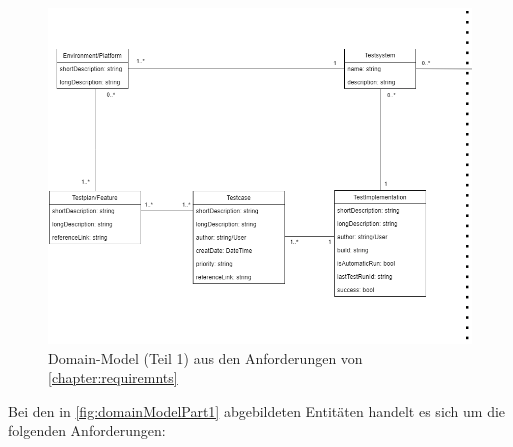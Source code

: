 \documentclass[a4paper, fontsize=11pt, parskip=half, twoside]{scrreprt}
\begin{document}
	\begin{figure}[ht]
		\centering
		\includegraphics[scale=0.6]{assets/TCMS_DomainModel_part1.png}
		\caption{Domain-Model (Teil 1) aus den Anforderungen von \autoref{chapter:requiremnts}}
		\label{fig:domainModelPart1}
	\end{figure}

	Bei den in \autoref{fig:domainModelPart1} abgebildeten Entitäten handelt es sich um die folgenden Anforderungen:
	
\end{document}

